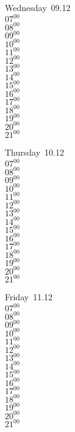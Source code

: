 \documentclass[11pt,a4paper]{book}\usepackage[]{graphicx}\usepackage[]{color}
\begin{document}
\begin{weekdaybox}
  Wednesday~09.12\\
  { 
  \vfill
  $07^{00}$\\
$08^{00}$\\
$09^{00}$\\
$10^{00}$\\
$11^{00}$\\
$12^{00}$\\
$13^{00}$\\
$14^{00}$\\
$15^{00}$\\
$16^{00}$\\
$17^{00}$\\
$18^{00}$\\
$19^{00}$\\
$20^{00}$\\
$21^{00}$\\
  }
\end{weekdaybox}
\clearpage
\begin{headerbox}
\end{headerbox}
\begin{weekdaybox}
  Thursday~10.12\\
  { 
  \vfill
  $07^{00}$\\
$08^{00}$\\
$09^{00}$\\
$10^{00}$\\
$11^{00}$\\
$12^{00}$\\
$13^{00}$\\
$14^{00}$\\
$15^{00}$\\
$16^{00}$\\
$17^{00}$\\
$18^{00}$\\
$19^{00}$\\
$20^{00}$\\
$21^{00}$\\
  }
\end{weekdaybox} 
\begin{weekdaybox}
  Friday~11.12\\
  { 
  \vfill
  $07^{00}$\\
$08^{00}$\\
$09^{00}$\\
$10^{00}$\\
$11^{00}$\\
$12^{00}$\\
$13^{00}$\\
$14^{00}$\\
$15^{00}$\\
$16^{00}$\\
$17^{00}$\\
$18^{00}$\\
$19^{00}$\\
$20^{00}$\\
$21^{00}$\\
  }
\end{weekdaybox}
\end{document}
